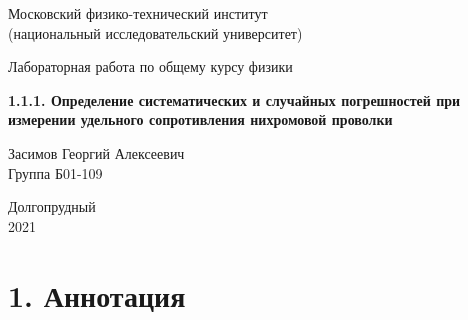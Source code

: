 




\begin{titlepage}

    \newpage
    \begin{center}
        \normalsize Московский физико-технический институт \\(национальный исследовательский университет)
    \end{center}

    \vspace{6em}

    \begin{center}
        \Large Лабораторная работа по общему курсу физики\\
    \end{center}

    \vspace{1em}

    \begin{center}
        \Large \textbf{1.1.1. Определение систематических и случайных погрешностей при измерении удельного сопротивления нихромовой проволки}
    \end{center}

    \vspace{2em}

    \begin{center}
        \large Засимов Георгий Алексеевич \\
        Группа Б01-109
    \end{center}

    \vspace{\fill}

    \begin{center}
    Долгопрудный \\2021
    \end{center}
    
\end{titlepage}



\section*{1. Аннотация}

